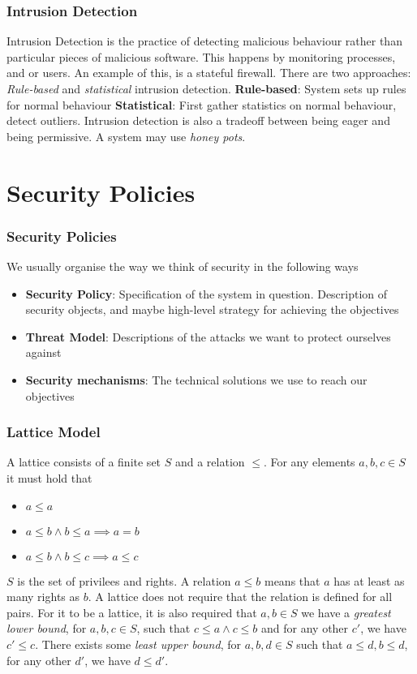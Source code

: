 \documentclass[14pt]{beamer}
\begin{document}
    \begin{frame}
        \frametitle{Intrusion Detection}
            Intrusion Detection is the practice of detecting malicious behaviour rather than particular pieces of malicious software. This happens by monitoring processes, and or users. 
            An example of this, is a stateful firewall. There are two approaches: \textit{Rule-based} and \textit{statistical} intrusion detection. 
            \textbf{Rule-based}: System sets up rules for normal behaviour
            \textbf{Statistical}: First gather statistics on normal behaviour, detect outliers. 
            Intrusion detection is also a tradeoff between being eager and being permissive. 
            A system may use \textit{honey pots}. 
    \end{frame}

\section{Security Policies}
    \begin{frame}
        \frametitle{Security Policies}
            We usually organise the way we think of security in the following ways
            \begin{itemize}
                \item \textbf{Security Policy}: Specification of the system in question. Description of security objects, and maybe high-level strategy for achieving the objectives 
                \item \textbf{Threat Model}: Descriptions of the attacks we want to protect ourselves against
                \item \textbf{Security mechanisms}: The technical solutions we use to reach our objectives
            \end{itemize}
    \end{frame}

    \begin{frame}
        \frametitle{Lattice Model}
            A lattice consists of a finite set $S$ and a relation $\leq$. For any elements $a, b, c \in S$ it must hold that
            \begin{itemize}
                \item $a \leq a$
                \item $a \leq b \land b \leq a \implies a = b$
                \item $a \leq b \land b \leq c \implies a \leq c$ 
            \end{itemize}
            $S$ is the set of privilees and rights. A relation $a \leq b$ means that $a$ has at least as many rights as $b$. A lattice does not require that the relation is defined for all pairs. 
            For it to be a lattice, it is also required that $a, b \in S$ we have a \textit{greatest lower bound}, for $a, b, c \in S$, such that $c \leq a \land c \leq b$ and for any other $c'$, we have $c' \leq c$. 
            There exists some \textit{least upper bound}, for $a, b, d \in S$ such that $a \leq d, b \leq d$, for any other $d'$, we have $d \leq d'$. 
    \end{frame}
\end{document}
